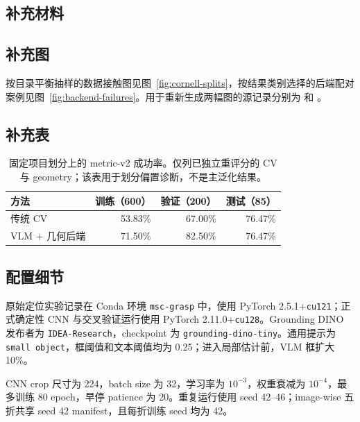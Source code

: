 \documentclass{l4proj}
\begin{document}
\begin{appendices}

\chapter{补充材料}

\section{补充图}
按目录平衡抽样的数据接触图见图~\ref{fig:cornell-splits}，按结果类别选择的后端配对案例见图~\ref{fig:backend-failures}。用于重新生成两幅图的源记录分别为  和 。

\section{补充表}
\begin{table}[htbp]
  \centering
  \caption{固定项目划分上的 metric-v2 成功率。仅列已独立重评分的 CV 与 geometry；该表用于划分偏置诊断，不是主泛化结果。}
  \label{tab:split-success}
  \begin{tabular}{lrrr}
    \toprule
    方法 & 训练（600） & 验证（200） & 测试（85） \\
    \midrule
    传统 CV & 53.83\% & 67.00\% & 76.47\% \\
    VLM + 几何后端 & 71.50\% & 82.50\% & 76.47\% \\
    \bottomrule
  \end{tabular}
\end{table}

\section{配置细节}
原始定位实验记录在 Conda 环境 \texttt{msc-grasp} 中，使用 PyTorch 2.5.1+\texttt{cu121}；正式确定性 CNN 与交叉验证运行使用 PyTorch 2.11.0+\texttt{cu128}。Grounding DINO 发布者为 \texttt{IDEA-Research}，checkpoint 为 \texttt{grounding-dino-tiny}。通用提示为 \texttt{small object}，框阈值和文本阈值均为 0.25；进入局部估计前，VLM 框扩大 10\%。

CNN crop 尺寸为 224，batch size 为 32，学习率为 $10^{-3}$，权重衰减为 $10^{-4}$，最多训练 80 epoch，早停 patience 为 20。重复运行使用 seed 42--46；image-wise 五折共享 seed 42 manifest，且每折训练 seed 均为 42。


\end{appendices}
\end{document}
